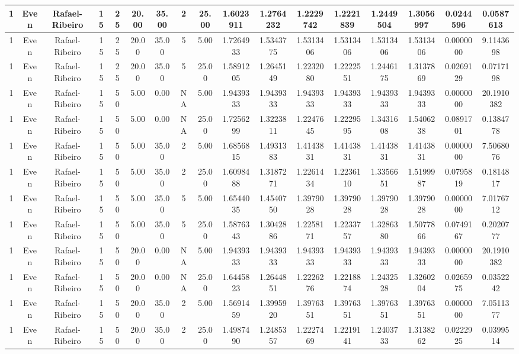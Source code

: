 \documentclass[a4paper]{article}
\begin{document}
\begin{center}
\begin{tabular}{ | c | c | c | c | c | c | c | c | c | c | c | c | c | c | c | c | c | }
		\hline
		1	&	Even	&	Rafael-Ribeiro	&	15	&	25	&	20.00	&	35.00	&	2	&	25.00	&	1.6023911	&	1.2764232	&	1.2229742	&	1.2221839	&	1.2449504	&	1.3056997	&	0.0244596	&	0.0587613 \\
		\hline
		1	&	Even	&	Rafael-Ribeiro	&	15	&	25	&	20.00	&	35.00	&	5	&	5.00	&	1.7264933	&	1.5343775	&	1.5313406	&	1.5313406	&	1.5313406	&	1.5313406	&	0.0000000	&	9.1143698 \\
		\hline
		1	&	Even	&	Rafael-Ribeiro	&	15	&	25	&	20.00	&	35.00	&	5	&	25.00	&	1.5891205	&	1.2645149	&	1.2232080	&	1.2222551	&	1.2446175	&	1.3137869	&	0.0269129	&	0.0717198 \\
		\hline
		1	&	Even	&	Rafael-Ribeiro	&	15	&	50	&	5.00	&	0.00	&	NA	&	5.00	&	1.9439333	&	1.9439333	&	1.9439333	&	1.9439333	&	1.9439333	&	1.9439333	&	0.0000000	&	20.1910382 \\
		\hline
		1	&	Even	&	Rafael-Ribeiro	&	15	&	50	&	5.00	&	0.00	&	NA	&	25.00	&	1.7256299	&	1.3223811	&	1.2247645	&	1.2229595	&	1.3431608	&	1.5406238	&	0.0891701	&	0.1384778 \\
		\hline
		1	&	Even	&	Rafael-Ribeiro	&	15	&	50	&	5.00	&	35.00	&	2	&	5.00	&	1.6856815	&	1.4931383	&	1.4143831	&	1.4143831	&	1.4143831	&	1.4143831	&	0.0000000	&	7.5068076 \\
		\hline
		1	&	Even	&	Rafael-Ribeiro	&	15	&	50	&	5.00	&	35.00	&	2	&	25.00	&	1.6098488	&	1.3187271	&	1.2261434	&	1.2236110	&	1.3356651	&	1.5199987	&	0.0795819	&	0.1814817 \\
		\hline
		1	&	Even	&	Rafael-Ribeiro	&	15	&	50	&	5.00	&	35.00	&	5	&	5.00	&	1.6544035	&	1.4540750	&	1.3979028	&	1.3979028	&	1.3979028	&	1.3979028	&	0.0000000	&	7.0176712 \\
		\hline
		1	&	Even	&	Rafael-Ribeiro	&	15	&	50	&	5.00	&	35.00	&	5	&	25.00	&	1.5876343	&	1.3042886	&	1.2258171	&	1.2233757	&	1.3286380	&	1.5077866	&	0.0749167	&	0.2020777 \\
		\hline
		1	&	Even	&	Rafael-Ribeiro	&	15	&	50	&	20.00	&	0.00	&	NA	&	5.00	&	1.9439333	&	1.9439333	&	1.9439333	&	1.9439333	&	1.9439333	&	1.9439333	&	0.0000000	&	20.1910382 \\
		\hline
		1	&	Even	&	Rafael-Ribeiro	&	15	&	50	&	20.00	&	0.00	&	NA	&	25.00	&	1.6445823	&	1.2644851	&	1.2226276	&	1.2218874	&	1.2432528	&	1.3260204	&	0.0265975	&	0.0352242 \\
		\hline
		1	&	Even	&	Rafael-Ribeiro	&	15	&	50	&	20.00	&	35.00	&	2	&	5.00	&	1.5691459	&	1.3995920	&	1.3976351	&	1.3976351	&	1.3976351	&	1.3976351	&	0.0000000	&	7.0511377 \\
		\hline
		1	&	Even	&	Rafael-Ribeiro	&	15	&	50	&	20.00	&	35.00	&	2	&	25.00	&	1.4987490	&	1.2485357	&	1.2227469	&	1.2219141	&	1.2403733	&	1.3138262	&	0.0222925	&	0.0399514 \\

\end{tabular}
\end{center}
\end{document}
